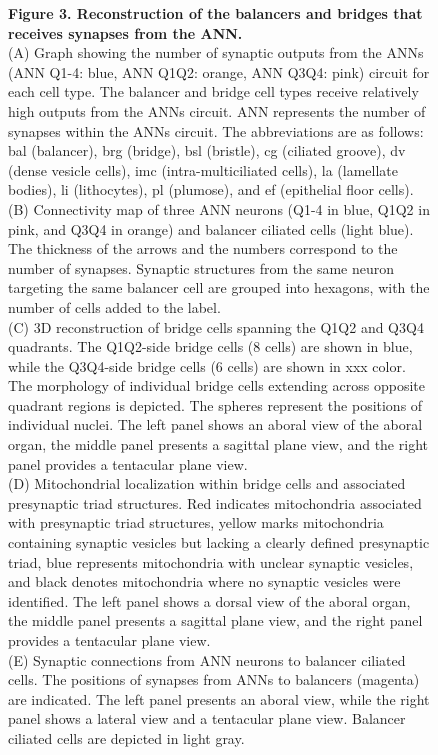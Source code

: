 \documentclass[
  11pt,
]{article}
\begin{document}
\begin{figure}[H]
\caption{\textbf{Figure 3. Reconstruction of the balancers and bridges
that receives synapses from the ANN.}\\
(A) Graph showing the number of synaptic outputs from the ANNs (ANN
Q1-4: blue, ANN Q1Q2: orange, ANN Q3Q4: pink) circuit for each cell
type. The balancer and bridge cell types receive relatively high outputs
from the ANNs circuit. ANN represents the number of synapses within the
ANNs circuit. The abbreviations are as follows: bal (balancer), brg
(bridge), bsl (bristle), cg (ciliated groove), dv (dense vesicle cells),
imc (intra-multiciliated cells), la (lamellate bodies), li (lithocytes),
pl (plumose), and ef (epithelial floor cells).\\
(B) Connectivity map of three ANN neurons (Q1-4 in blue, Q1Q2 in pink,
and Q3Q4 in orange) and balancer ciliated cells (light blue). The
thickness of the arrows and the numbers correspond to the number of
synapses. Synaptic structures from the same neuron targeting the same
balancer cell are grouped into hexagons, with the number of cells added
to the label.\\
(C) 3D reconstruction of bridge cells spanning the Q1Q2 and Q3Q4
quadrants. The Q1Q2-side bridge cells (8 cells) are shown in blue, while
the Q3Q4-side bridge cells (6 cells) are shown in xxx color. The
morphology of individual bridge cells extending across opposite quadrant
regions is depicted. The spheres represent the positions of individual
nuclei. The left panel shows an aboral view of the aboral organ, the
middle panel presents a sagittal plane view, and the right panel
provides a tentacular plane view.\\
(D) Mitochondrial localization within bridge cells and associated
presynaptic triad structures. Red indicates mitochondria associated with
presynaptic triad structures, yellow marks mitochondria containing
synaptic vesicles but lacking a clearly defined presynaptic triad, blue
represents mitochondria with unclear synaptic vesicles, and black
denotes mitochondria where no synaptic vesicles were identified. The
left panel shows a dorsal view of the aboral organ, the middle panel
presents a sagittal plane view, and the right panel provides a
tentacular plane view.\\
(E) Synaptic connections from ANN neurons to balancer ciliated cells.
The positions of synapses from ANNs to balancers (magenta) are
indicated. The left panel presents an aboral view, while the right panel
shows a lateral view and a tentacular plane view. Balancer ciliated
cells are depicted in light gray.\\
}
\end{figure}
\end{document}
